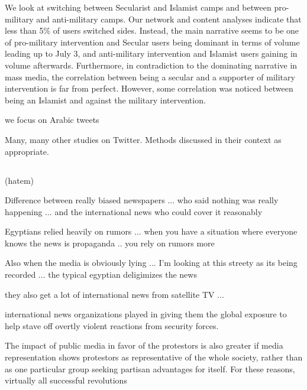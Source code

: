 	We look at switching between Secularist and Islamist camps and between pro-military and anti-military camps. Our network and content analyses indicate that less than 5\% of users switched sides. Instead, the main narrative seems to be one of pro-military intervention and Secular users being dominant in terms of volume leading up to July 3, and anti-military intervention and Islamist users gaining in volume afterwards. Furthermore, in contradiction to the dominating narrative in mass media, the correlation between being a secular and a supporter of military intervention is far from perfect. However, some correlation was noticed between being an Islamist and against the military intervention.
	
	we focus on Arabic tweets
	
	
Many, many other studies on Twitter. Methods discussed in their context as appropriate.

	
\subsection{}

(hatem)

Difference between really biased newspapers ... who said nothing was really happening ... and the international news who could cover it reasonably

Egyptians relied heavily on rumors ... when you have a situation where everyone knows the news is propaganda .. you rely on rumors more  

    Also when the media is obviously lying ... I'm looking at this streety as its being recorded ... the typical egyptian deligimizes the news

	they also get a lot of international news from satellite TV ... 

\cite{hussain_what_2013}
 international news organizations played in giving them the global exposure
to help stave off overtly violent reactions from security forces.

\citep{goldstone_cross-class_2011}

The impact
of public media in favor of the protestors is also greater if media representation shows
protestors as representative of the whole society, rather than as one particular group
seeking partisan advantages for itself.
For these reasons, virtually all successful revolutions


